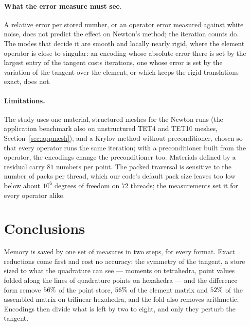 \documentclass[sigconf,balance=false]{acmart}
\begin{document}
\paragraph{What the error measure must see.}  A relative error per stored number, or an operator
error measured against white noise, does not predict the effect on Newton's method; the iteration
counts do.  The modes that decide it are smooth and locally nearly rigid, where the element operator
is close to singular: an encoding whose absolute error there is set by the largest entry of the
tangent costs iterations, one whose error is set by the variation of the tangent over the element,
or which keeps the rigid translations exact, does not.

\paragraph{Limitations.}  The study uses one material, structured meshes for the Newton runs (the
application benchmark also on unstructured TET4 and TET10 meshes, Section~\ref{sec:appmesh}), and a Krylov method
without preconditioner, chosen so that every operator runs the same iteration; with a
preconditioner built from the operator, the encodings change the preconditioner too.  Materials
defined by a residual carry $81$ numbers per point.  The packed traversal is sensitive to the number
of packs per thread, which our code's default pack size leaves too low below about $10^6$
degrees of freedom on 72 threads; the measurements set it for every operator alike.

\section{Conclusions}

Memory is saved by one set of measures in two steps, for every format.  Exact reductions come
first and cost no accuracy: the symmetry of the tangent, a store sized to what the quadrature can
see --- moments on tetrahedra, point values folded along the lines of quadrature points on
hexahedra --- and the difference form remove $56\%$ of the point store,
$56\%$ of the element matrix and $52\%$ of the assembled matrix
on trilinear hexahedra, and the fold also removes arithmetic.  Encodings then divide what is left by
two to eight, and only they perturb the tangent.
\end{document}
